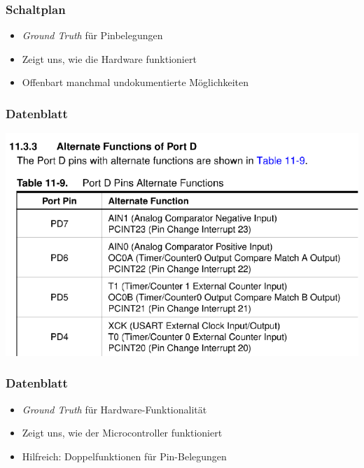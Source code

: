 \documentclass{beamer}
\begin{document}

\begin{frame}
\frametitle{Schaltplan}
\begin{itemize}
\item \textit{Ground Truth} für Pinbelegungen
\item Zeigt uns, wie die Hardware funktioniert
\item Offenbart manchmal undokumentierte Möglichkeiten
\end{itemize}


\end{frame}



\begin{frame}
\frametitle{Datenblatt}
\includegraphics{datasheet.pdf}
\end{frame}

\begin{frame}
\frametitle{Datenblatt}
\begin{itemize}
\item \textit{Ground Truth} für Hardware-Funktionalität
\item Zeigt uns, wie der Microcontroller funktioniert
\item Hilfreich: Doppelfunktionen für Pin-Belegungen
\end{itemize}

\end{frame}
\end{document}
